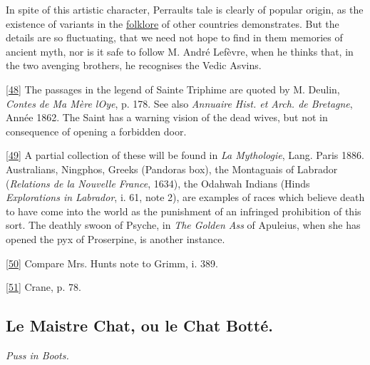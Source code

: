 \documentclass[14pt,a4paper]{memoir}
\newcommand{\ul}[1]{\uline{#1}}
\begin{document}
In spite of this artistic character, Perrault\textquotesingle s tale is
clearly of popular origin, as the existence of variants in the
\ul{folklore} of other countries demonstrates. But the details are so
fluctuating, that we need not hope to find in them memories of ancient
myth, nor is it safe to follow M. André Lefèvre, when he thinks that, in
the two avenging brothers, he recognises the Vedic Asvins.

\protect\hypertarget{4533318093929944247_33931-h-0.htm.xhtmlux5cux23Footnote_48}{}{}\protect\hyperlink{4533318093929944247_33931-h-0.htm.xhtmlux5cux23FNanchor_48}{{{[}48{]}}}
The passages in the legend of Sainte Triphime are quoted by M. Deulin,
\emph{Contes de Ma Mère l\textquotesingle Oye}, p. 178. See also
\emph{Annuaire Hist. et Arch. de Bretagne}, Année 1862. The Saint has a
warning vision of the dead wives, but not in consequence of opening a
forbidden door.

\protect\hypertarget{4533318093929944247_33931-h-0.htm.xhtmlux5cux23Footnote_49}{}{}\protect\hyperlink{4533318093929944247_33931-h-0.htm.xhtmlux5cux23FNanchor_49}{{{[}49{]}}}
A partial collection of these will be found in \emph{La Mythologie},
Lang. Paris 1886. Australians, Ningphos, Greeks
(Pandora\textquotesingle s box), the Montaguais of Labrador
(\emph{Relations de la Nouvelle France}, 1634), the Odahwah Indians
(Hind\textquotesingle s \emph{Explorations in Labrador}, i. 61, note 2),
are examples of races which believe death to have come into the world as
the punishment of an infringed prohibition of this sort. The deathly
swoon of Psyche, in \emph{The Golden Ass} of Apuleius, when she has
opened the pyx of Proserpine, is another instance.

\protect\hypertarget{4533318093929944247_33931-h-0.htm.xhtmlux5cux23Footnote_50}{}{}\protect\hyperlink{4533318093929944247_33931-h-0.htm.xhtmlux5cux23FNanchor_50}{{{[}50{]}}}
Compare Mrs. Hunt\textquotesingle s note to Grimm, i. 389.

\protect\hypertarget{4533318093929944247_33931-h-0.htm.xhtmlux5cux23Footnote_51}{}{}\protect\hyperlink{4533318093929944247_33931-h-0.htm.xhtmlux5cux23FNanchor_51}{{{[}51{]}}}
Crane, p. 78.

\subsection{Le Maistre Chat, ou le Chat Botté.}

\emph{Puss in Boots.} \\
\end{document}
